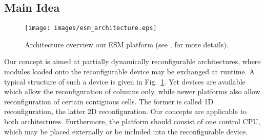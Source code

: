\documentclass[10pt,journal]{IEEEtran}
\begin{document}
\subsection{Main Idea}

\begin{figure}[t]
        \centering \texttt{[image: images/esm\_architecture.eps]}
        \caption{Architecture overview our ESM platform (see \cite{AGMTFV_ESM_2007},\cite{bobda_erlangen_2005} for more details).} \label{fig:esm-arch}
\end{figure}


Our concept is aimed at partially dynamically reconfigurable
architectures, where modules loaded onto the reconfigurable device may
be exchanged at runtime.  A typical structure of such a device is
given in Fig.~\ref{fig:esm-arch}.  Yet devices are available which
allow the reconfiguration of columns only, while newer platforms also
allow reconfiguration of certain contiguous cells. The former is
called 1D reconfiguration, the latter 2D reconfiguration. Our concepts
are applicable to both architectures. Furthermore, the platform should
consist of one control CPU, which may be placed externally or be
included into the reconfigurable device.
\end{document}
